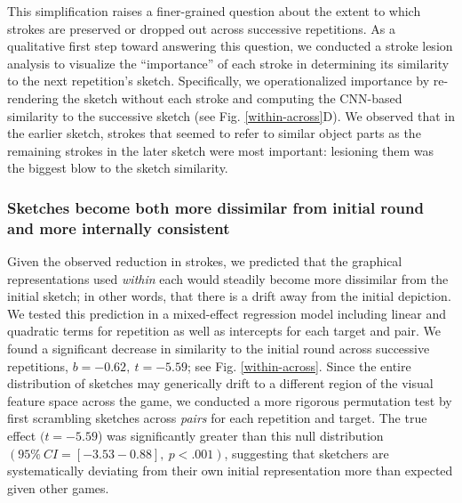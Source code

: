 \documentclass[10pt,letterpaper]{article}
\begin{document}
This simplification raises a finer-grained question about the extent to which strokes are preserved or dropped out across successive repetitions.
As a qualitative first step toward answering this question, we conducted a stroke lesion analysis to visualize the ``importance'' of each stroke in determining its similarity to the next repetition's sketch.
Specifically, we operationalized importance by re-rendering the sketch without each stroke and computing the CNN-based similarity to the successive sketch (see Fig. \ref{within-across}D).
We observed that in the earlier sketch, strokes that seemed to refer to similar object parts as the remaining strokes in the later sketch were most important: lesioning them was the biggest blow to the sketch similarity.  %

\subsubsection{Sketches become both more dissimilar from initial round and more internally consistent}

Given the observed reduction in strokes, we predicted that the graphical representations used \emph{within} each would steadily become more dissimilar from the initial sketch; in other words, that there is a drift away from the initial depiction.
We tested this prediction in a mixed-effect regression model including linear and quadratic terms for repetition as well as intercepts for each target and pair.
We found a significant decrease in similarity to the initial round across successive repetitions, $b = -0.62,~t = -5.59$; see Fig. \ref{within-across}.
Since the entire distribution of sketches may generically drift to a different region of the visual feature space across the game, we conducted a more rigorous permutation test by first scrambling sketches across \emph{pairs} for each repetition and target.
The true effect $(t = -5.59$) was significantly greater than this null distribution $(95\%~CI= [-3.53 -0.88], ~p < .001)$, suggesting that sketchers are systematically deviating from their own initial representation more than expected given other games.
\end{document}
